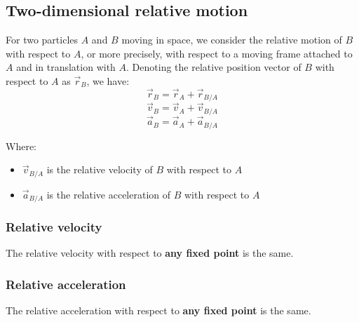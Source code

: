 \documentclass[11pt]{article}
\begin{document}
\subsection{Two-dimensional relative motion}
\label{sec:org4df2248}
For two particles \(A\) and \(B\) moving in space, we consider the relative motion of \(B\) with respect to \(A\), or more precisely, with respect to a moving frame attached to \(A\) and in translation with \(A\). Denoting the relative position vector of \(B\) with respect to \(A\) as \(\vec{r}_B\), we have:
\[\vec{r}_B = \vec{r}_A + \vec{r}_{B/A}\]
\[\vec{v}_B = \vec{v}_A + \vec{v}_{B/A}\]
\[\vec{a}_B = \vec{a}_A + \vec{a}_{B/A}\]

Where:
\begin{itemize}
\item \(\vec{v}_{B/A}\) is the relative velocity of \(B\) with respect to \(A\)
\item \(\vec{a}_{B/A}\) is the relative acceleration of \(B\) with respect to \(A\)
\end{itemize}

\subsubsection{Relative velocity}
\label{sec:org3e3a47f}
The relative velocity with respect to \textbf{any fixed point} is the same.

\subsubsection{Relative acceleration}
\label{sec:org531c0a1}
The relative acceleration with respect to \textbf{any fixed point} is the same.

 \newpage
\end{document}
